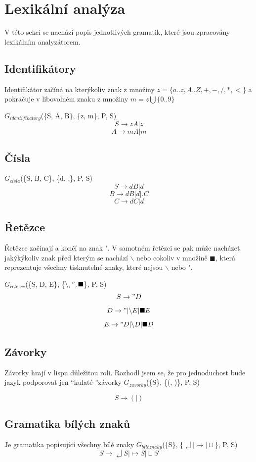 \documentclass[a4paper,11pt]{article}
\begin{document}
\section{Lexikální analýza}
V této sekci se nachází popis jednotlivých gramatik, které jsou zpracovány lexikálním analyzátorem.

\subsection{Identifikátory}
Identifikátor začíná na kterýkoliv znak z množiny $z = \{a..z, A..Z, +, -, /, *, <\}$
a pokračuje v libovolném znaku z množiny $m = z \bigcup \{0..9\}$ 
\linebreak

$G_{identifikatory}$(\{S, A, B\}, \{z, m\}, P, S)
$$S \rightarrow zA | z$$
$$A \rightarrow mA | m$$

\subsection{Čísla}
$G_{cisla}$(\{S, B, C\}, \{d, .\}, P, S)
$$S \rightarrow dB | d$$
$$B \rightarrow dB | d | .C$$
$$C \rightarrow dC | d$$

\subsection{Řetězce}
Řetězce začínají a končí na znak ". V samotném řetězci se pak může nacházet jakýkýkoliv znak před kterým se nachází $\backslash$ nebo cokoliv v množině $\blacksquare$, která reprezentuje všechny tisknutelné znaky, které nejsou $\backslash$ nebo ".

$G_{retezce}$(\{S, D, E\}, \{$\backslash, ", \blacksquare$\}, P, S)
$$S \rightarrow "D$$
$$D \rightarrow " | \backslash E | \blacksquare E$$
$$E \rightarrow "D | \backslash D | \blacksquare D$$

\subsection{Závorky}
Závorky hrají v lispu důležitou roli. Rozhodl jsem se, že pro jednoduchost bude jazyk podporovat jen \textquotedblleft kulaté \textquotedblright závorky
$G_{zavorky}$(\{S\}, \{(, )\}, P, S)

$$S \rightarrow (|)$$

\subsection{Gramatika bílých znaků}
Je gramatika popisující všechny bílé znaky $G_{bileznaky}$(\{S\}, \{$\dlsh | \mapsto | \sqcup$\}, P, S)
$$S \rightarrow  \dlsh S | \mapsto S | \sqcup S$$
\end{document}
